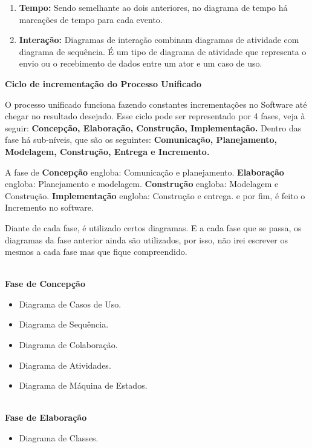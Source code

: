 \documentclass[12pt, a4paper]{article}
\begin{document}
\begin{enumerate}[label*=\textbf{\arabic*}.]
\begin{enumerate}[label*=\textbf{\arabic*}.]
            \item \textbf{Tempo:} Sendo semelhante ao dois anteriores, 
            no diagrama de tempo há marcações de tempo para cada evento.
            
            \item \textbf{Interação:} Diagramas de interação combinam diagramas de atividade com diagrama de sequência.
            É um tipo de diagrama de atividade que representa o envio ou o recebimento de dados entre um ator e um caso de uso.
            
        \end{enumerate}

\end{enumerate}

\newpage
\vspace*{1cm}
\noindent
\textbf{Ciclo de incrementação do Processo Unificado}

O processo unificado funciona fazendo constantes incrementações no Software
até chegar no resultado desejado. Esse ciclo pode ser representado por 4 fases, veja à seguir:
\textbf{Concepção, Elaboração, Construção, Implementação.} Dentro das fase há sub-níveis, que são os seguintes:
\textbf{Comunicação, Planejamento, Modelagem, Construção, Entrega e Incremento.}

A fase de \textbf{Concepção} engloba: Comunicação e planejamento. \textbf{Elaboração} engloba: Planejamento e modelagem.
\textbf{Construção} engloba: Modelagem e Construção. \textbf{Implementação} engloba: Construção e entrega.
e por fim, é feito o Incremento no software.

Diante de cada fase, é utilizado certos diagramas. E a cada fase que se passa, os diagramas da fase anterior
ainda são utilizados, por isso, não irei escrever os mesmos a cada fase mas que fique compreendido.

\noindent
\textbf{\\Fase de Concepção}
\begin{itemize}{\bfseries}
    \item Diagrama de Casos de Uso.
    \item Diagrama de Sequência.
    \item Diagrama de Colaboração.
    \item Diagrama de Atividades.
    \item Diagrama de Máquina de Estados.
\end{itemize}

\noindent
\textbf{\\Fase de Elaboração}
\begin{itemize}{\bfseries}
    \item Diagrama de Classes.
\end{itemize}
\end{document}
